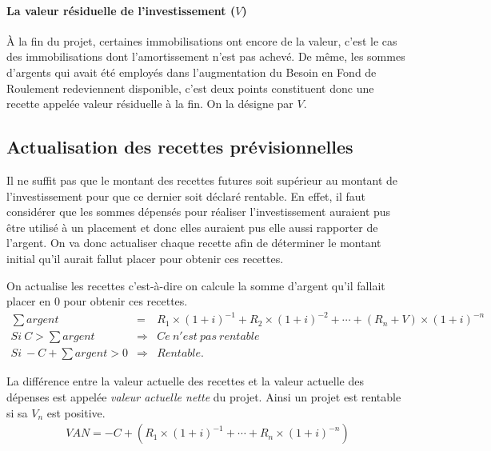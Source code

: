 		\paragraph{La valeur résiduelle de l'investissement ($V$)\newline}
		À la fin du projet, certaines immobilisations ont encore de la valeur, c'est le cas des immobilisations dont l'amortissement n'est pas achevé. De même, les sommes d'argents qui avait été
		employés dans l'augmentation du Besoin en Fond de Roulement redeviennent disponible, c'est deux points constituent donc une recette appelée valeur résiduelle à la fin. On la désigne par $V$.
		\subsection{Actualisation des recettes prévisionnelles}
		Il ne suffit pas que le montant des recettes futures soit supérieur au montant de l'investissement pour que ce dernier soit déclaré rentable. En effet, il faut considérer que les sommes dépensés pour réaliser
		l'investissement auraient pus être utilisé à un placement et donc elles auraient pus elle aussi rapporter de l'argent. On va donc actualiser chaque recette afin de déterminer le montant initial
		qu'il aurait fallut placer pour obtenir ces recettes.

		On actualise les recettes c'est-à-dire on calcule la somme d'argent qu'il fallait placer en 0 pour obtenir ces recettes.		
		\begin{eqnarray*}
			\sum argent &=& R_1 \times (1+i)^{-1} + R_2 \times (1+i)^{-2} + \cdots + (R_n + V) \times (1+i)^{-n}\\
		Si\ C > \sum argent &\Longrightarrow& Ce\ n'est\ pas\ rentable \\
		Si\ -C + \sum argent > 0 &\Longrightarrow& Rentable. 
		\end{eqnarray*}
		

		La différence entre la valeur actuelle des recettes et la valeur actuelle des dépenses est appelée \textit{valeur actuelle nette} du projet. Ainsi
		un projet est rentable si sa $V_n$ est positive.
		\begin{eqnarray*}
			VAN = -C + (R_1 \times (1 + i)^{-1} + \cdots + R_n \times (1+i)^{-n})
		\end{eqnarray*}
		\newpage
